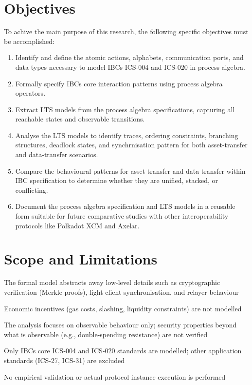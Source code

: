 \section{Objectives}\label{objectives}

To achive the main purpose of this research, the following specific
objectives must be accomplished:

\begin{enumerate}
\tightlist
\item
  Identify and define the atomic actions, alphabets, communication
  ports, and data types necessary to model IBC\textquotesingle s ICS-004
  and ICS-020 in process algebra.
\item
  Formally specify IBC\textquotesingle s core interaction patterns using
  process algebra operators.
\item
  Extract LTS models from the process algebra specifications, capturing
  all reachable states and observable transitions.
\item
  Analyse the LTS models to identify traces, ordering constraints,
  branching structures, deadlock states, and synchrnisation pattern for
  both asset-transfer and data-transfer scenarios.
\item
  Compare the behavioural patterns for asset transfer and data transfer
  within IBC specification to determine whether they are unified,
  stacked, or conflicting.
\item
  Document the process algebra specification and LTS models in a
  reusable form suitable for future comparative studies with other
  interoperability protocols like Polkadot XCM and Axelar.
\end{enumerate}

\section{Scope and Limitations}\label{scope-and-limitations}

The formal model abstracts away low-level details such as cryptographic
verification (Merkle proofs), light client synchronisation, and relayer
behaviour

Economic incentives (gas costs, slashing, liquidity constraints) are not
modelled

The analysis focuses on observable behaviour only; security properties
beyond what is observable (e.g., double-spending resistance) are not
verified

Only IBC\textquotesingle s core ICS-004 and ICS-020 standards are
modelled; other application standards (ICS-27, ICS-31) are excluded

No empirical validation or actual protocol instance execution is
performed

